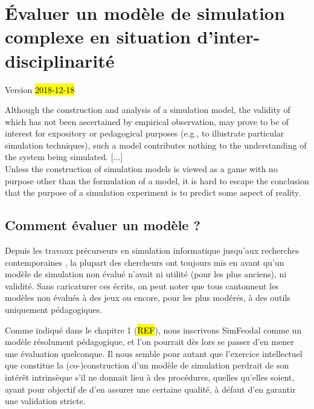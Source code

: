 \chapter{Évaluer un modèle de simulation complexe en situation d'inter-disciplinarité}
\begin{center}
{\large Version \hl{2018-12-18}}
\end{center}
\minitoc

\clearpage
\setlength{\epigraphwidth}{0.7\textwidth}
\epigraph{Although the construction and analysis of a simulation model, the validity of which has not been ascertained by empirical observation, may prove to be of interest for expository or pedagogical purposes (e.g., to illustrate particular simulation techniques), such	a model contributes nothing to the understanding of the system being simulated.
[...]\\
Unless the construction of simulation models is viewed as a game with no purpose other than the formulation of a model, it is hard to escape the conclusion that the purpose of a simulation experiment is to predict some aspect of reality.
}{\cite[B-92-93;96]{naylor_verification_1967}}


\section{Comment évaluer un modèle ?}

Depuis les travaux précurseurs en simulation informatique \autocite{naylor_verification_1967,hermann_validation_1967,sargent_validation_1979} jusqu'aux recherches contemporaines \autocite{amblard_evaluation_2006,banos_pour_2013,augusiak_merging_2014, rey-coyrehourcq_plateforme_2015}, la plupart des chercheurs ont toujours mis en avant qu'un modèle de simulation non évalué n'avait ni utilité (pour les plus anciens), ni validité.
Sans caricaturer ces écrits, on peut noter que tous cantonnent les modèles non évalués à des \og jeux\fg{} ou encore, pour les plus modérés, à des outils uniquement pédagogiques.

Comme indiqué dans le chapitre 1 (\hl{REF}), nous inscrivons SimFeodal comme un modèle résolument pédagogique, et l'on pourrait dès lors se passer d'en mener une évaluation quelconque.
Il nous semble pour autant que l'exercice intellectuel que constitue la (co-)construction d'un modèle de simulation perdrait de son intérêt intrinsèque s'il ne donnait lieu à des procédures, quelles qu'elles soient, ayant pour objectif de d'en assurer une certaine qualité, à défaut d'en garantir une validation stricte.

